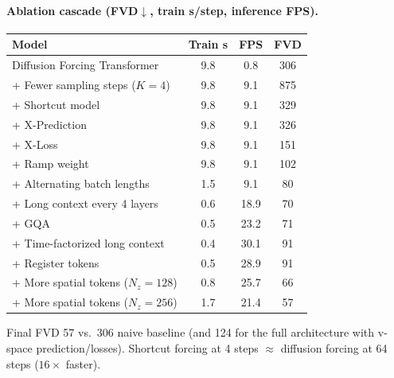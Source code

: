 \documentclass[11pt]{article}
\begin{document}
\paragraph{Ablation cascade (FVD$\downarrow$, train s/step, inference FPS).}
\begin{center}
\begin{tabular}{lccc}
\toprule
Model & Train s & FPS & FVD \\
\midrule
Diffusion Forcing Transformer        & 9.8 & 0.8  & 306 \\
\quad + Fewer sampling steps ($K{=}4$) & 9.8 & 9.1  & 875 \\
\quad + Shortcut model                & 9.8 & 9.1  & 329 \\
\quad + X-Prediction                  & 9.8 & 9.1  & 326 \\
\quad + X-Loss                        & 9.8 & 9.1  & 151 \\
\quad + Ramp weight                   & 9.8 & 9.1  & 102 \\
\quad + Alternating batch lengths     & 1.5 & 9.1  & 80  \\
\quad + Long context every 4 layers   & 0.6 & 18.9 & 70  \\
\quad + GQA                           & 0.5 & 23.2 & 71  \\
\quad + Time-factorized long context  & 0.4 & 30.1 & 91  \\
\quad + Register tokens               & 0.5 & 28.9 & 91  \\
\quad + More spatial tokens ($N_z{=}128$) & 0.8 & 25.7 & 66  \\
\quad + More spatial tokens ($N_z{=}256$) & 1.7 & 21.4 & 57  \\
\bottomrule
\end{tabular}
\end{center}
Final FVD 57 vs.\ 306 naive baseline (and 124 for the full architecture with v-space
prediction/losses). Shortcut forcing at 4 steps $\approx$ diffusion forcing at 64 steps
($16\times$ faster).
\end{document}

